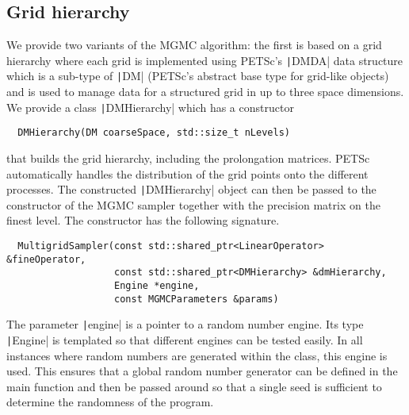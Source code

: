 \documentclass[
fontsize=11pt,
paper=a4,
numbers=noenddot
]{scrartcl}
\begin{document}
\subsection{Grid hierarchy}
We provide two variants of the MGMC algorithm: the first is based on a grid hierarchy where each grid is implemented using PETSc's \texttt|DMDA| data structure which is a sub-type of \texttt|DM| (PETSc's abstract base type for grid-like objects) and is used to manage data for a structured grid in up to three space dimensions. We provide a class \texttt|DMHierarchy| which has a constructor
\begin{verbatim}
  DMHierarchy(DM coarseSpace, std::size_t nLevels)
\end{verbatim}
that builds the grid hierarchy, including the prolongation matrices. PETSc automatically handles the distribution of the grid points onto the different processes. The constructed \texttt|DMHierarchy| object can then be passed to the constructor of the MGMC sampler together with the precision matrix on the finest level. The constructor has the following signature.
\begin{verbatim}
  MultigridSampler(const std::shared_ptr<LinearOperator> &fineOperator,
                   const std::shared_ptr<DMHierarchy> &dmHierarchy, 
                   Engine *engine,
                   const MGMCParameters &params)
\end{verbatim}
The parameter \texttt|engine| is a pointer to a random number engine. Its type \texttt|Engine| is templated so that different engines can be tested easily. In all instances where random numbers are generated within the class, this engine is used. This ensures that a global random number generator can be defined in the main function and then be passed around so that a single seed is sufficient to determine the randomness of the program. 
\end{document}
